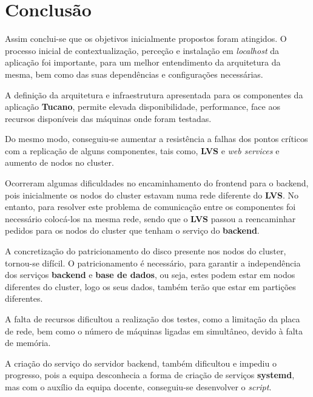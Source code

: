 \chapter{Conclusão} \label{chap:conc}

\hspace{5mm} Assim conclui-se que os objetivos inicialmente propostos foram atingidos. O processo inicial de contextualização, perceção e instalação em \emph{localhost} da aplicação foi importante, para um melhor entendimento da arquitetura da mesma, bem como das suas dependências e configurações necessárias.

\hspace{5mm} A definição da arquitetura e infraestrutura apresentada para os componentes da aplicação \textbf{Tucano}, permite elevada disponibilidade, performance, face aos recursos disponíveis das máquinas onde foram testadas. 

\hspace{5mm}Do mesmo modo, conseguiu-se aumentar a resistência a falhas dos pontos críticos com a replicação de alguns componentes, tais como, \textbf{LVS} e \emph{web services} e aumento de nodos no cluster. 

\hspace{5mm} Ocorreram algumas dificuldades no encaminhamento do frontend para o backend, pois inicialmente os nodos do cluster estavam numa rede diferente do \textbf{LVS}. No entanto, para resolver este problema de comunicação entre os componentes foi necessário colocá-los na mesma rede, sendo que o \textbf{LVS} passou a reencaminhar pedidos para os nodos do cluster que tenham o serviço do \textbf{backend}.

\hspace{5mm} A concretização do patricionamento do disco presente nos nodos do cluster, tornou-se difícil. O patricionamento é necessário, para garantir a independência dos serviços \textbf{backend} e \textbf{base de dados}, ou seja, estes podem estar em nodos diferentes do cluster, logo os seus dados, também terão que estar em partições diferentes.

\hspace{5mm} A falta de recursos dificultou a realização dos testes, como a limitação da placa de rede, bem como o número de máquinas ligadas em simultâneo, devido à falta de memória. 

\hspace{5mm} A criação do serviço do servidor backend, também dificultou  e impediu o progresso, pois a equipa desconhecia a forma de criação de serviços \textbf{systemd}, mas com o auxílio da equipa docente, conseguiu-se desenvolver o \emph{script}.

